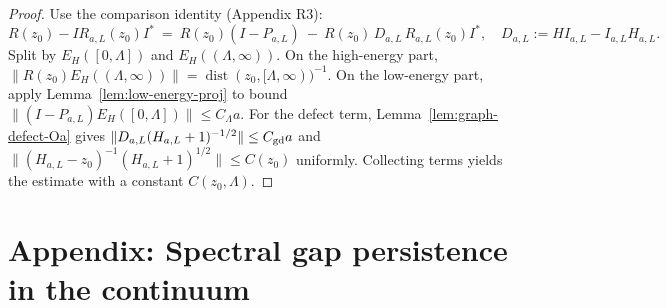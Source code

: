 \documentclass[11pt]{amsart}
\theoremstyle{plain}
\theoremstyle{definition}
\theoremstyle{remark}
\begin{document}
\begin{proof}
Use the comparison identity (Appendix R3):
\[
  R(z_0)-I R_{a,L}(z_0) I^*\ =\ R(z_0)(I-P_{a,L})\ -\ R(z_0)\,D_{a,L}\,R_{a,L}(z_0) I^*,\quad D_{a,L}:=H I_{a,L}-I_{a,L}H_{a,L}.
\]
Split by $E_H([0,\Lambda])$ and $E_H((\Lambda,\infty))$. On the high-energy part, $\|R(z_0) E_H((\Lambda,\infty))\|=\operatorname{dist}(z_0,[\Lambda,\infty))^{-1}$. On the low-energy part, apply Lemma~\ref{lem:low-energy-proj} to bound $\|(I-P_{a,L})E_H([0,\Lambda])\|\le C_\Lambda a$. For the defect term, Lemma~\ref{lem:graph-defect-Oa} gives $\|D_{a,L}(H_{a,L}+1)^{-1/2}\|\le C_{\rm gd} a$ and $\|(H_{a,L}-z_0)^{-1}(H_{a,L}+1)^{1/2}\|\le C(z_0)$ uniformly. Collecting terms yields the estimate with a constant $C(z_0,\Lambda)$.
\end{proof}

\medskip
\section{Appendix: Spectral gap persistence in the continuum}
\end{document}
